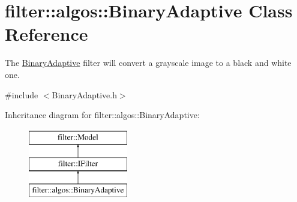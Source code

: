 \hypertarget{classfilter_1_1algos_1_1_binary_adaptive}{}\section{filter\+:\+:algos\+:\+:Binary\+Adaptive Class Reference}
\label{classfilter_1_1algos_1_1_binary_adaptive}


The \hyperlink{classfilter_1_1algos_1_1_binary_adaptive}{Binary\+Adaptive} filter will convert a grayscale image to a black and white one.  




{\ttfamily \#include $<$Binary\+Adaptive.\+h$>$}

Inheritance diagram for filter\+:\+:algos\+:\+:Binary\+Adaptive\+:\begin{figure}[H]
\begin{center}
\leavevmode
\includegraphics[height=3.000000cm]{d6/d12/classfilter_1_1algos_1_1_binary_adaptive}
\end{center}
\end{figure}
